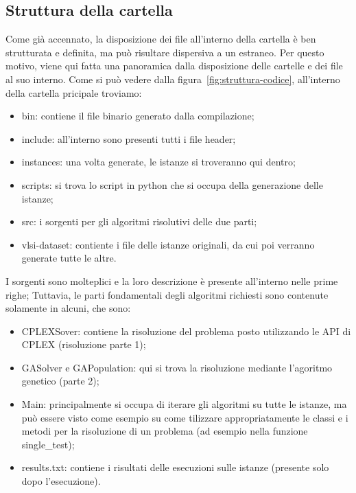 \subsection{Struttura della cartella}\label{subsec:struttura}
Come già accennato, la disposizione dei file all'interno della cartella è ben strutturata e definita,
ma può risultare dispersiva a un estraneo.
Per questo motivo, viene qui fatta una panoramica dalla disposizione delle cartelle e dei file al suo interno.
Come si può vedere dalla figura~\ref{fig:struttura-codice}, all'interno della cartella pricipale troviamo:
\begin{itemize}
	\item \textsf{bin}: contiene il file binario generato dalla compilazione;
	\item \textsf{include}: all'interno sono presenti tutti i file header;
	\item \textsf{instances}: una volta generate, le istanze si troveranno qui dentro;
	\item \textsf{scripts}: si trova lo script in python che si occupa della generazione
	delle istanze;
	\item \textsf{src}: i sorgenti per gli algoritmi risolutivi delle due parti;
	\item \textsf{vlsi-dataset}: contiente i file delle istanze originali, da cui poi verranno generate tutte le altre.
\end{itemize}
%
I sorgenti sono molteplici e la loro descrizione è presente all'interno nelle prime righe;
Tuttavia, le parti fondamentali degli algoritmi richiesti sono contenute solamente in alcuni, che sono:
\begin{itemize}
	\item \textsf{CPLEXSover}: contiene la risoluzione del problema posto utilizzando le API di CPLEX (risoluzione parte 1);
	\item \textsf{GASolver} e \textsf{GAPopulation}: qui si trova la risoluzione mediante l'agoritmo genetico (parte 2);
	\item \textsf{Main}: principalmente si occupa di iterare gli algoritmi su tutte le istanze,
	ma può essere visto come esempio su come tilizzare appropriatamente le classi e i metodi per la
	risoluzione di un problema (ad esempio nella funzione \textsf{single\_test});
	\item \textsf{results.txt}: contiene i risultati delle esecuzioni sulle istanze (presente solo dopo l'esecuzione).
\end{itemize}
%
\label{fig:struttura-codice}
